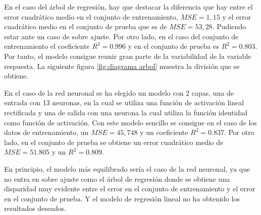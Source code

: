 \noindent En el caso del árbol de regresión, hay que destacar la diferencia que hay entre el error cuadrático medio en el conjunto de entrenamiento, $MSE=1,15$ y el error cuadrático medio en el conjunto de prueba que es de $MSE=53,28$. Pudiendo estar ante un caso de sobre ajuste. Por otro lado, en el caso del conjunto de entrenamiento el coeficiente $R^2=0.996$ y en el conjunto de prueba es $R^2=0.803$.  Por tanto, el modelo consigue reunir gran parte de la variabilidad de la variable respuesta. La siguiente figura \ref{fig:diagrama arbol} muestra la división que se obtiene.
  

\noindent En el caso de la red neuronal se ha elegido un modelo con 2 capas, una de entrada con 13 neuronas, en la cual se utiliza una función de activación lineal rectificada y una de salida con una neurona la cual utiliza la función identidad como función de activación. Con este modelo sencillo se consigue en el caso de los datos de entrenamiento, un $MSE=45,748$ y un coeficiente $R^2=0.837$. Por otro lado, en el conjunto de prueba se obtiene un error cuadrático medio de $MSE=51.805$ y un $R^2=0.809$.

\noindent En principio, el modelo más equilibrado sería el caso de la red neuronal, ya que no entra en sobre ajuste como el árbol de regresión donde se obtiene una disparidad muy evidente entre el error en el conjunto de entrenamiento y el error en el conjunto de prueba. Y el modelo de regresión lineal no ha obtenido los resultados deseados. 

